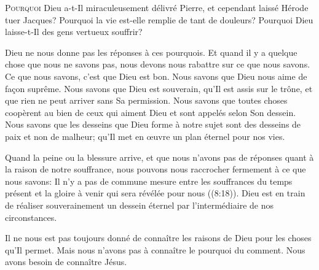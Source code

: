 

\lettrine{P}{ourquoi} Dieu a-t-Il miraculeusement délivré Pierre,
 et cependant laissé Hérode tuer Jacques?
 Pourquoi la vie est-elle remplie de tant de douleurs?
 Pourquoi Dieu laisse-t-Il des gens vertueux souffrir?

Dieu ne nous donne pas les réponses à ces pourquois.
 Et quand il y a quelque chose que nous ne savons pas,
 nous devons nous rabattre sur ce que nous savons.
 Ce que nous savons, c'est que Dieu est bon.
 Nous savons que Dieu nous aime de fa\c{c}on suprême.
 Nous savons que Dieu est souverain, qu'Il est assis sur le trône,
 et que rien ne peut arriver sans Sa permission.
 Nous savons que toutes choses coopèrent au bien de ceux
 qui aiment Dieu et sont appelés selon Son dessein.
 Nous savons que les desseins que Dieu forme à notre sujet
 sont des desseins de paix et non de malheur;
 qu'Il met en \oe{}uvre un plan éternel pour nos vies.


Quand la peine ou la blessure arrive, 
 et que nous n'avons pas de réponses 
 quant à la raison de notre souffrance, nous pouvons nous raccrocher
 fermement à ce que nous savons:
 \Og Il n'y a pas de commune mesure entre les souffrances du temps présent
 et la gloire à venir qui sera révélée pour nous \Fg{} ((8:18)).
 Dieu est en train de réaliser souverainement un dessein éternel
 par l'intermédiaire de nos circonstances.

Il ne nous est pas toujours donné de connaître les raisons de Dieu
 pour les choses qu'Il permet. Mais nous n'avons pas à connaître
 le pourquoi du comment. Nous avons besoin de connaître Jésus.

\dvrule




